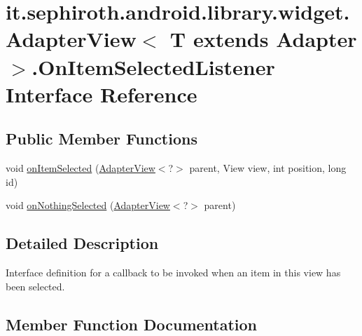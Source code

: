 \hypertarget{interfaceit_1_1sephiroth_1_1android_1_1library_1_1widget_1_1_adapter_view_1_1_on_item_selected_listener}{}\section{it.\+sephiroth.\+android.\+library.\+widget.\+Adapter\+View$<$ T extends Adapter $>$.On\+Item\+Selected\+Listener Interface Reference}
\label{interfaceit_1_1sephiroth_1_1android_1_1library_1_1widget_1_1_adapter_view_1_1_on_item_selected_listener}
\subsection*{Public Member Functions}
\begin{DoxyCompactItemize}
\item 
void \hyperlink{interfaceit_1_1sephiroth_1_1android_1_1library_1_1widget_1_1_adapter_view_1_1_on_item_selected_listener_a0f166b5a47627d5b8d25491ef24ef3e3}{on\+Item\+Selected} (\hyperlink{classit_1_1sephiroth_1_1android_1_1library_1_1widget_1_1_adapter_view}{Adapter\+View}$<$?$>$ parent, View view, int position, long id)
\item 
void \hyperlink{interfaceit_1_1sephiroth_1_1android_1_1library_1_1widget_1_1_adapter_view_1_1_on_item_selected_listener_a3439ca8b37442f4f9fe69cae64f08fa4}{on\+Nothing\+Selected} (\hyperlink{classit_1_1sephiroth_1_1android_1_1library_1_1widget_1_1_adapter_view}{Adapter\+View}$<$?$>$ parent)
\end{DoxyCompactItemize}


\subsection{Detailed Description}
Interface definition for a callback to be invoked when an item in this view has been selected. 

\subsection{Member Function Documentation}
\mbox{\label{interfaceit_1_1sephiroth_1_1android_1_1library_1_1widget_1_1_adapter_view_1_1_on_item_selected_listener_a0f166b5a47627d5b8d25491ef24ef3e3}} 
